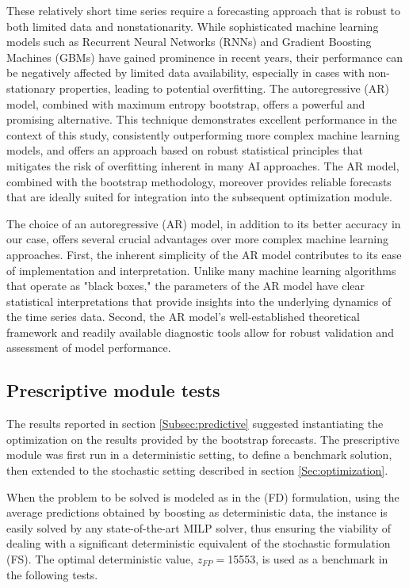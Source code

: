 \documentclass[ijoc,sglanonrev]{informs4}
\begin{document}
These relatively short time series require a forecasting approach that is robust to both limited data and nonstationarity.  While sophisticated machine learning models such as Recurrent Neural Networks (RNNs) and Gradient Boosting Machines (GBMs) have gained prominence in recent years, their performance can be negatively affected by limited data availability, especially in cases with non-stationary properties, leading to potential overfitting.  The autoregressive (AR) model, combined with maximum entropy bootstrap, offers a powerful and promising alternative.  This technique demonstrates excellent performance in the context of this study, consistently outperforming more complex machine learning models, and offers an approach based on robust statistical principles that mitigates the risk of overfitting inherent in many AI approaches. The AR model, combined with the bootstrap methodology, moreover provides reliable forecasts that are ideally suited for integration into the subsequent optimization module.  

The choice of an autoregressive (AR) model, in addition to its better accuracy in our case, offers several crucial advantages over more complex machine learning approaches. First, the inherent simplicity of the AR model contributes to its ease of implementation and interpretation.  Unlike many machine learning algorithms that operate as "black boxes," the parameters of the AR model have clear statistical interpretations that provide insights into the underlying dynamics of the time series data. Second, the AR model's well-established theoretical framework and readily available diagnostic tools allow for robust validation and assessment of model performance.  

\subsection{Prescriptive module tests}  \label{Subsec:prescriptive}

The results reported in section \ref{Subsec:predictive} suggested instantiating the optimization on the results provided by the bootstrap forecasts. The prescriptive module was first run in a deterministic setting, to define a benchmark solution, then extended to the stochastic setting described in section \ref{Sec:optimization}.

When the problem to be solved is modeled as in the (FD) formulation, using the average predictions obtained by boosting as deterministic data, the instance is easily solved by any state-of-the-art MILP solver, thus ensuring the viability of dealing with a significant deterministic equivalent of the stochastic formulation (FS). The optimal deterministic value, $z_{FP}=$15553, is used as a benchmark in the following tests.
\end{document}

